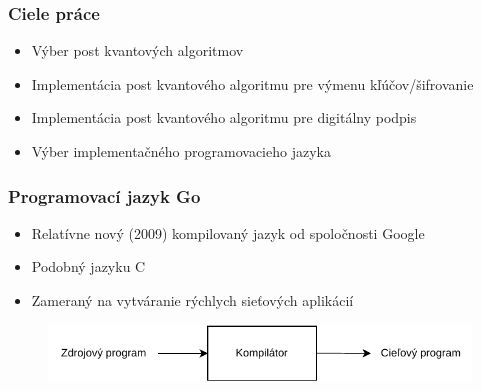 \documentclass[%
  14pt,       				%
	t,                  %
	aspectratio=1610,   %
	unicode,						%
]{beamer}				    	%
\begin{document}
\disablenavigationsymbols

\maketitle


\begin{frame}[c]
	\frametitle{Ciele práce}
	\large{\begin{itemize}
			\item Výber post kvantových algoritmov
			\item Implementácia post kvantového algoritmu pre výmenu kľúčov/šifrovanie
			\item Implementácia post kvantového algoritmu pre digitálny podpis
			\item Výber implementačného programovacieho jazyka
		\end{itemize}}
	
\end{frame}



\begin{frame}[c]
	\frametitle{Programovací jazyk Go}
	\large{\begin{itemize}
			\item Relatívne nový (2009) kompilovaný jazyk od spoločnosti Google
			\item Podobný jazyku C
			\item Zameraný na vytváranie rýchlych sieťových aplikácií
		\end{itemize}}
	
	\begin{figure}[htbp]
		\centering
		\includegraphics[width=\textwidth]{pictures/compiler_sk.pdf}
	\end{figure}
\end{frame}
\end{document}
